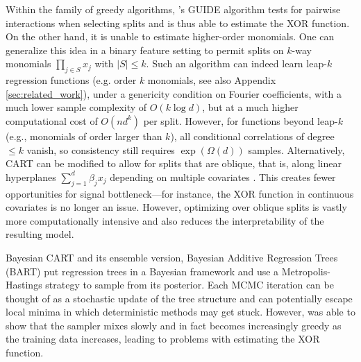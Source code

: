 \documentclass[11pt]{article}
\newcommand{\stabmsp}{\textsf{SMSP}}
\newcommand{\comment}[2]{{#2}}
\begin{document}
Within the family of greedy algorithms, \cite{loh2002regression}'s GUIDE algorithm tests for pairwise interactions when selecting splits and is thus able to estimate the XOR function.
On the other hand, it is unable to estimate higher-order monomials.
\comment{red}{One can generalize this idea in a binary feature setting to permit splits on $k$-way monomials $\prod_{j \in S} x_j$ with $|S|\leq k$. 
Such an algorithm can indeed learn leap-$k$ regression functions (e.g. order $k$ monomials, see also Appendix \ref{sec:related_work}), under a genericity condition on Fourier coefficients, with a much lower sample complexity of $O(k\log d)$, but at a much higher computational cost of $O(nd^k)$ per split.
However, for functions beyond leap-$k$ (e.g., monomials of order larger than $k$), all conditional correlations of degree $\leq k$ vanish, so consistency still requires $\exp(\Omega(d))$ samples.}
Alternatively, CART can be modified to allow for splits that are oblique, that is, along linear hyperplanes $\sum_{j=1}^d \beta_j x_j $ depending on multiple covariates \citep{cattaneo2022convergence}.
This creates fewer opportunities for signal bottleneck---for instance, the XOR function in continuous covariates is no longer an issue.
However, optimizing over oblique splits is vastly more computationally intensive and also reduces the interpretability of the resulting model. 

Bayesian CART \citep{chipman1998bayesian} and its ensemble version, Bayesian Additive Regression Trees (BART) \citep{chipman2010bart} put regression trees in a Bayesian framework and use a Metropolis-Hastings strategy to sample from its posterior.
Each MCMC iteration can be thought of as a stochastic update of the tree structure and can potentially escape local minima in which deterministic methods may get stuck.
However, \cite{tan2024computational} was able to show that the sampler mixes slowly and in fact becomes increasingly greedy as the training data increases, leading to problems with estimating the XOR function.

\end{document}
